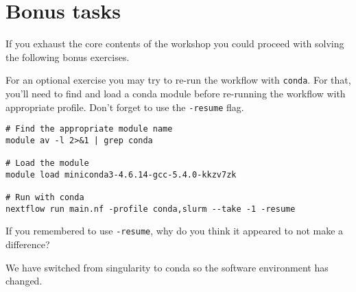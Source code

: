 \section{Bonus tasks}

If you exhaust the core contents of the workshop you could proceed with solving the following bonus exercises.

\begin{bonus}
For an optional exercise you may try to re-run the workflow with \texttt{conda}.
For that, you'll need to find and load a conda module before re-running the workflow with appropriate profile. Don't forget to use the \texttt{-resume} flag.
\begin{answer}
\begin{lstlisting}
# Find the appropriate module name
module av -l 2>&1 | grep conda

# Load the module
module load miniconda3-4.6.14-gcc-5.4.0-kkzv7zk

# Run with conda
nextflow run main.nf -profile conda,slurm --take -1 -resume

\end{lstlisting}
\end{answer}

If you remembered to use \texttt{-resume}, why do you think it appeared to not make a difference?

\begin{answer}
We have switched from singularity to conda so the software environment has changed.  
\end{answer}


\end{bonus}


